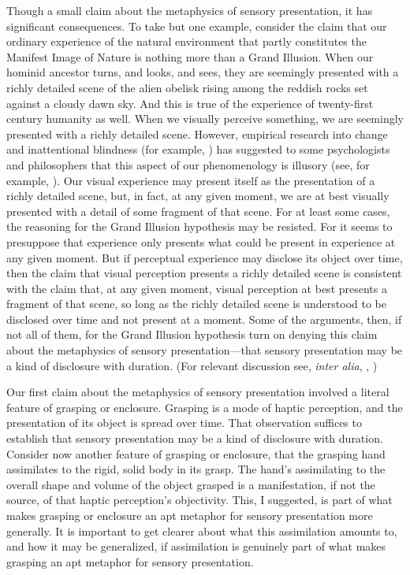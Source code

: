 Though a small claim about the metaphysics of sensory presentation, it has significant consequences. To take but one example, consider the claim that our ordinary experience of the natural environment that partly constitutes the Manifest Image of Nature is nothing more than a Grand Illusion. When our hominid ancestor turns, and looks, and sees, they are seemingly presented with a richly detailed scene of the alien obelisk rising among the reddish rocks set against a cloudy dawn sky. And this is true of the experience of twenty-first century humanity as well. When we visually perceive something, we are seemingly presented with a richly detailed scene. However, empirical research into change and inattentional blindness (for example, \citealt{Simons:1999wf}) has suggested to some psychologists and philosophers that this aspect of our phenomenology is illusory (see, for example, \citealt{Blackmore:1995an}). Our visual experience may present itself as the presentation of a richly detailed scene, but, in fact, at any given moment, we are at best visually presented with a detail of some fragment of that scene. For at least some cases, the reasoning for the Grand Illusion hypothesis may be resisted. For it seems to presuppose that experience only presents what could be present in experience at any given moment. But if perceptual experience may disclose its object over time, then the claim that visual perception presents a richly detailed scene is consistent with the claim that, at any given moment, visual perception at best presents a fragment of that scene, so long as the richly detailed scene is understood to be disclosed over time and not present at a moment. Some of the arguments, then, if not all of them, for the Grand Illusion hypothesis turn on denying this claim about the metaphysics of sensory presentation---that sensory presentation may be a kind of disclosure with duration. (For relevant discussion see, \emph{inter alia}, \citealt{Noe:2004fk}, \citealt[72--74]{Campbell:2014aa})

Our first claim about the metaphysics of sensory presentation involved a literal feature of grasping or enclosure. Grasping is a mode of haptic perception, and the presentation of its object is spread over time. That observation suffices to establish that sensory presentation may be a kind of disclosure with duration. Consider now another feature of grasping or enclosure, that the grasping hand assimilates to the rigid, solid body in its grasp. The hand's assimilating to the overall shape and volume of the object grasped is a manifestation, if not the source, of that haptic perception's objectivity. This, I suggested, is part of what makes grasping or enclosure an apt metaphor for sensory presentation more generally. It is important to get clearer about what this assimilation amounts to, and how it may be generalized, if assimilation is genuinely part of what makes grasping an apt metaphor for sensory presentation.

